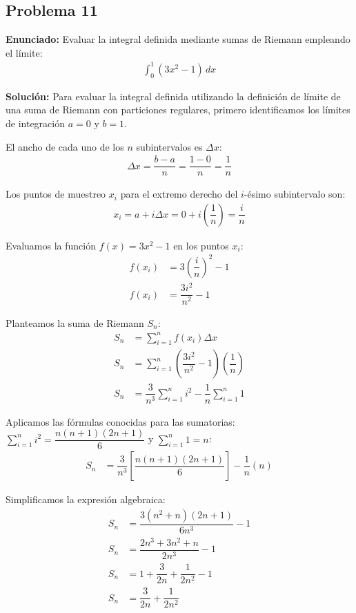 \subsection*{Problema 11}

\textbf{Enunciado:} Evaluar la integral definida 
mediante sumas de Riemann empleando el límite:
\begin{align*}
\int_{0}^{1} (3x^2 - 1) \, dx
\end{align*}

\textbf{Solución:} Para evaluar la integral 
definida utilizando la definición de límite 
de una suma de Riemann con particiones 
regulares, primero identificamos los 
límites de integración $a = 0$ y $b = 1$.

El ancho de cada uno de los $n$ subintervalos 
es $\Delta x$:
\begin{align*}
\Delta x = \dfrac{b - a}{n} = \dfrac{1 - 0}{n} = \dfrac{1}{n}
\end{align*}

Los puntos de muestreo $x_i$ para el extremo 
derecho del $i$-ésimo subintervalo son:
\begin{align*}
x_i = a + i \Delta x = 0 + i \left(\dfrac{1}{n}\right) = \dfrac{i}{n}
\end{align*}

Evaluamos la función $f(x) = 3x^2 - 1$ en 
los puntos $x_i$:
\begin{align*}
f(x_i) &= 3\left(\dfrac{i}{n}\right)^2 - 1 \\
f(x_i) &= \dfrac{3i^2}{n^2} - 1
\end{align*}

Planteamos la suma de Riemann $S_n$:
\begin{align*}
S_n &= \sum_{i=1}^{n} f(x_i) \Delta x \\
S_n &= \sum_{i=1}^{n} \left(\dfrac{3i^2}{n^2} - 1\right) \left(\dfrac{1}{n}\right) \\
S_n &= \dfrac{3}{n^3} \sum_{i=1}^{n} i^2 - \dfrac{1}{n} \sum_{i=1}^{n} 1
\end{align*}

Aplicamos las fórmulas conocidas para las 
sumatorias: $\sum_{i=1}^{n} i^2 = \dfrac{n(n+1)(2n+1)}{6}$ 
y $\sum_{i=1}^{n} 1 = n$:
\begin{align*}
S_n &= \dfrac{3}{n^3} \left[\dfrac{n(n+1)(2n+1)}{6}\right] - \dfrac{1}{n}(n)
\end{align*}

Simplificamos la expresión algebraica:
\begin{align*}
S_n &= \dfrac{3(n^2 + n)(2n + 1)}{6n^3} - 1 \\
S_n &= \dfrac{2n^3 + 3n^2 + n}{2n^3} - 1 \\
S_n &= 1 + \dfrac{3}{2n} + \dfrac{1}{2n^2} - 1 \\
S_n &= \dfrac{3}{2n} + \dfrac{1}{2n^2}
\end{align*}

